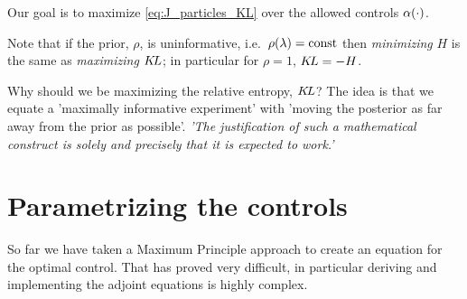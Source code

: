 \documentclass{article}
\begin{document}
Our goal is to maximize \cref{eq:J_particles_KL} over the allowed controls
${\alpha}(\cdot)$.

Note that if the prior, $\rho$, is uninformative, i.e.\ $\rho({\lambda})= { \mathrm{const} }$
then {\itshape minimizing} $H$ is the same as {\itshape maximizing} ${ K\!L}$; in
particular for $\rho = 1$, ${ K\!L} =  -H$.

Why should we be maximizing the relative entropy, ${ K\!L}$? The idea is that
we equate a 'maximally informative experiment' with 'moving the
posterior as far away from the prior as possible'.
{\itshape 'The justification of such a mathematical
construct is solely and precisely that it is expected to work.'}


\section{Parametrizing the controls}
So far we have taken a Maximum Principle approach to create an equation for the
optimal control. That has proved very difficult, in particular deriving
and implementing the adjoint equations is highly complex.
\end{document}
